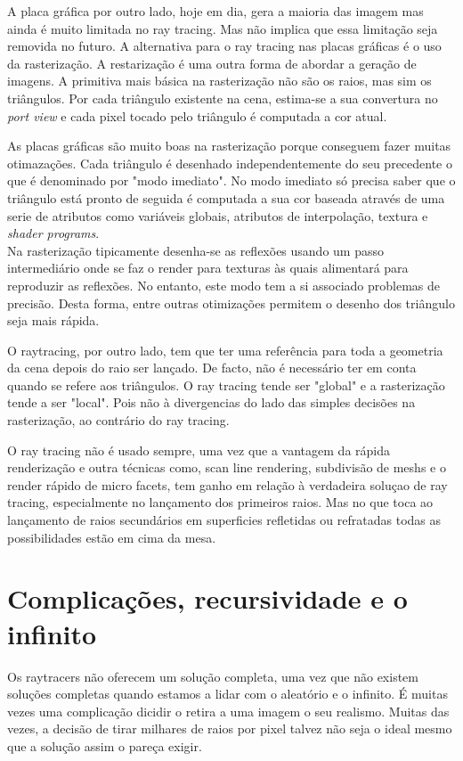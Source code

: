 \documentclass[12pt]{article}
\begin{document}
A placa gráfica por outro lado, hoje em dia, gera a maioria das imagem mas ainda é muito limitada no ray tracing. Mas não implica que essa limitação seja removida no futuro. A alternativa para o ray tracing nas placas gráficas é o uso da rasterização. A restarização é uma outra forma de abordar a geração de imagens.
A primitiva mais básica na rasterização não são os raios, mas sim os triângulos. Por cada triângulo existente na cena, estima-se a sua convertura no {\it port view} e cada pixel tocado pelo triângulo é computada a cor atual.

As placas gráficas são muito boas na rasterização porque conseguem fazer muitas otimazações. Cada triângulo é desenhado independentemente do seu precedente o que é denominado por "modo imediato". No modo imediato só precisa saber que o triângulo está pronto de seguida é computada a sua cor baseada através de uma serie de atributos como variáveis globais, atributos de interpolação, textura e {\it shader programs}.\\

Na rasterização tipicamente desenha-se as reflexões usando um passo intermediário onde se faz o render para texturas às quais alimentará para reproduzir as reflexões. No entanto, este modo tem a si associado problemas de precisão. Desta forma, entre outras otimizações permitem o desenho dos triângulo seja mais rápida.

O raytracing, por outro lado, tem que ter uma referência para toda a geometria da cena depois do raio ser lançado. De facto, não é necessário ter em conta quando se refere aos triângulos. O ray tracing tende ser "global" e a rasterização tende a ser "local". Pois não à divergencias do lado das simples decisões na rasterização, ao contrário do ray tracing.

O ray tracing não é usado sempre, uma vez que a vantagem da rápida renderização e outra técnicas como, scan line rendering, subdivisão de meshs e o render rápido de micro facets, tem ganho em relação à verdadeira soluçao de ray tracing, especialmente no lançamento dos primeiros raios. Mas no que toca ao lançamento de raios secundários em superficies refletidas ou refratadas todas as possibilidades estão em cima da mesa.

\section{Complicações, recursividade e o infinito}
\vspace{10 mm}
\hspace{8 mm}Os raytracers não oferecem um solução completa, uma vez que não existem soluções completas quando estamos a lidar com o aleatório e o infinito. É muitas vezes uma complicação dicidir o retira a uma imagem o seu realismo. Muitas das vezes, a decisão de tirar milhares de raios por pixel talvez não seja o ideal mesmo que a solução assim o pareça exigir.
\end{document}
